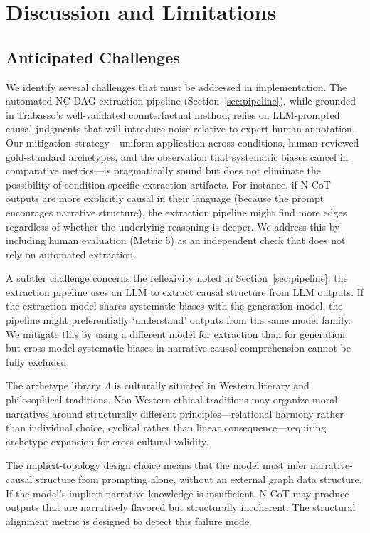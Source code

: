\documentclass[11pt,letterpaper]{article}
\theoremstyle{defn}
\begin{document}
\section{Discussion and Limitations}

\subsection{Anticipated Challenges}

We identify several challenges that must be addressed in implementation. The automated NC-DAG extraction pipeline (Section~\ref{sec:pipeline}), while grounded in Trabasso's well-validated counterfactual method, relies on LLM-prompted causal judgments that will introduce noise relative to expert human annotation. Our mitigation strategy---uniform application across conditions, human-reviewed gold-standard archetypes, and the observation that systematic biases cancel in comparative metrics---is pragmatically sound but does not eliminate the possibility of condition-specific extraction artifacts. For instance, if N-CoT outputs are more explicitly causal in their language (because the prompt encourages narrative structure), the extraction pipeline might find more edges regardless of whether the underlying reasoning is deeper. We address this by including human evaluation (Metric 5) as an independent check that does not rely on automated extraction.

A subtler challenge concerns the reflexivity noted in Section~\ref{sec:pipeline}: the extraction pipeline uses an LLM to extract causal structure from LLM outputs. If the extraction model shares systematic biases with the generation model, the pipeline might preferentially `understand' outputs from the same model family. We mitigate this by using a different model for extraction than for generation, but cross-model systematic biases in narrative-causal comprehension cannot be fully excluded.

The archetype library $\Lambda$ is culturally situated in Western literary and philosophical traditions. Non-Western ethical traditions may organize moral narratives around structurally different principles---relational harmony rather than individual choice, cyclical rather than linear consequence---requiring archetype expansion for cross-cultural validity.

The implicit-topology design choice means that the model must infer narrative-causal structure from prompting alone, without an external graph data structure. If the model's implicit narrative knowledge is insufficient, N-CoT may produce outputs that are narratively flavored but structurally incoherent. The structural alignment metric is designed to detect this failure mode.
\end{document}

